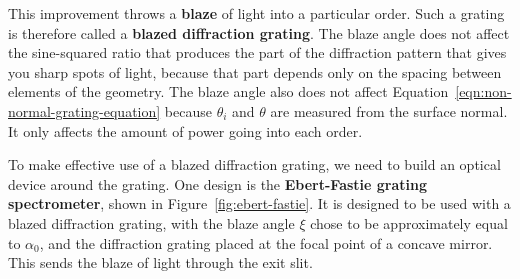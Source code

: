 \documentclass[]{manual}
\begin{document}
    This improvement throws a \textbf{blaze} of light into a particular order.
    Such a grating is therefore called a \textbf{blazed diffraction grating}.
    The blaze angle does not affect the sine-squared ratio that produces the part of the diffraction pattern that gives you sharp spots of light, because that part depends only on the spacing between elements of the geometry.
    The blaze angle also does not affect Equation~\eqref{eqn:non-normal-grating-equation} because $\theta_i$ and $\theta$ are measured from the surface normal.
    It only affects the amount of power going into each order.

    To make effective use of a blazed diffraction grating, we need to build an optical device around the grating.
    One design is the \textbf{Ebert-Fastie grating spectrometer}, shown in Figure~\ref{fig:ebert-fastie}.
    It is designed to be used with a blazed diffraction grating, with the blaze angle $\xi$ chose to be approximately equal to $\alpha_0$, and the diffraction grating placed at the focal point of a concave mirror.
    This sends the blaze of light through the exit slit.
\end{document}
